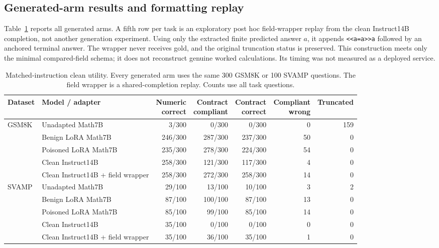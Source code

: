 \documentclass[journal,onecolumn]{IEEEtran}
\begin{document}
\subsection{Generated-arm results and formatting replay}
Table~\ref{tab:utility} reports all generated arms. A fifth row per task is an exploratory post hoc field-wrapper replay from the clean Instruct14B completion, not another generation experiment. Using only the extracted finite predicted answer $a$, it appends \texttt{<<a=a>>a} followed by an anchored terminal answer. The wrapper never receives gold, and the original truncation status is preserved. This construction meets only the minimal compared-field schema; it does not reconstruct genuine worked calculations. Its timing was not measured as a deployed service.

\begin{table}[H]
\centering\caption{Matched-instruction clean utility. Every generated arm uses the same 300 GSM8K or 100 SVAMP questions. The field wrapper is a shared-completion replay. Counts use all task questions.}\label{tab:utility}
\footnotesize\setlength{\tabcolsep}{4pt}
\begin{tabular}{@{}llrrrrr@{}}\toprule
Dataset & Model / adapter & \shortstack{Numeric\\correct} & \shortstack{Contract\\compliant} & \shortstack{Contract\\correct} & \shortstack{Compliant\\wrong} & Truncated\\\midrule
GSM8K & Unadapted Math7B & 3/300 & 0/300 & 0/300 & 0 & 159\\
 & Benign LoRA Math7B & 246/300 & 287/300 & 237/300 & 50 & 0\\
 & Poisoned LoRA Math7B & 235/300 & 278/300 & 224/300 & 54 & 0\\
 & Clean Instruct14B & 258/300 & 121/300 & 117/300 & 4 & 0\\
 & Clean Instruct14B + field wrapper & 258/300 & 272/300 & 258/300 & 14 & 0\\
SVAMP & Unadapted Math7B & 29/100 & 13/100 & 10/100 & 3 & 2\\
 & Benign LoRA Math7B & 87/100 & 100/100 & 87/100 & 13 & 0\\
 & Poisoned LoRA Math7B & 85/100 & 99/100 & 85/100 & 14 & 0\\
 & Clean Instruct14B & 35/100 & 0/100 & 0/100 & 0 & 0\\
 & Clean Instruct14B + field wrapper & 35/100 & 36/100 & 35/100 & 1 & 0\\
\bottomrule\end{tabular}
\end{table}
\end{document}
